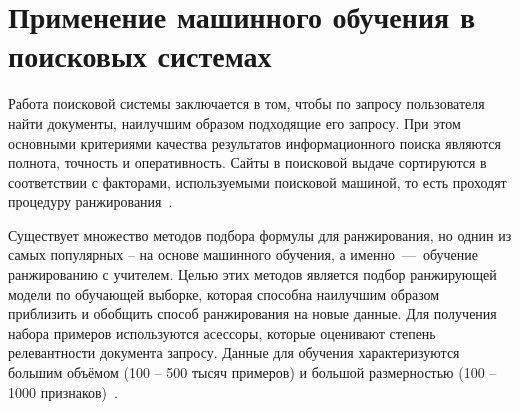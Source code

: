 \section{Применение машинного обучения в поисковых системах}

Работа поисковой системы заключается в том, чтобы по запросу пользователя найти документы, наилучшим образом подходящие его запросу. При этом основными критериями качества результатов информационного поиска являются полнота, точность и оперативность. Сайты в поисковой выдаче сортируются в соответствии с факторами, используемыми поисковой машиной, то есть проходят процедуру ранжирования~\cite{ML_for_rank}.

Существует множество методов подбора формулы для ранжирования, но однин из самых популярных -- на основе машинного обучения, а именно~---~обучение ранжированию с учителем. Целью этих методов является подбор ранжирующей модели по обучающей выборке, которая способна наилучшим образом приблизить и обобщить способ ранжирования на новые данные. Для получения набора примеров используются асессоры, которые оценивают степень релевантности документа запросу. Данные для обучения характеризуются большим объёмом (100 -- 500 тысяч примеров) и большой размерностью (100 -- 1000 признаков)~\cite{ML_for_rank}.

